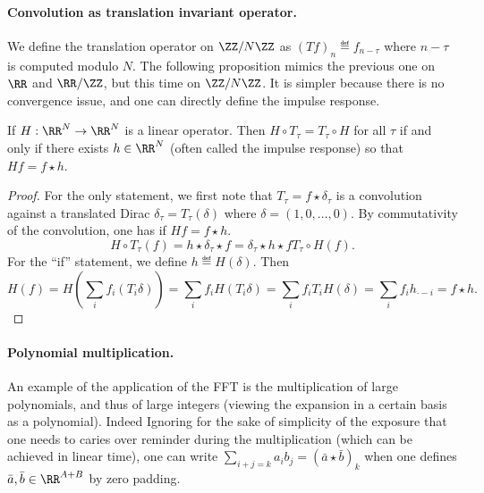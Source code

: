 \paragraph{Convolution as translation invariant operator.}

We define the translation operator on $\ZZ/N\ZZ$ as $(Tf)_n \eqdef f_{n-\tau}$ where $n-\tau$ is computed modulo $N$. The following proposition mimics the previous one on $\RR$ and $\RR/\ZZ$, but this time on $\ZZ/N\ZZ$. It is simpler because there is no convergence issue, and one can directly define the impulse response.

\begin{prop}
	If $H : \RR^N \rightarrow \RR^N$ is a linear operator. Then $H \circ T_\tau = T_\tau \circ H$ for all $\tau$ if and only if there exists $h \in \RR^N$ (often called the impulse response) so that $Hf = f \star h$.
\end{prop}

\begin{proof}
	For the only statement, we first note that $T_\tau = f \star \delta_{\tau}$ is a convolution against a translated Dirac $\delta_\tau=T_\tau(\delta)$ where $\delta=(1,0,\ldots,0)$. By commutativity of the convolution, one has if $Hf = f \star h$.
	$$
		H \circ T_\tau(f) = h \star \delta_\tau \star f = \delta_\tau \star h \star f
		T_\tau \circ H(f).
	$$	
	For the ``if'' statement, we define $h \eqdef H(\delta)$. Then 
	$$
		H(f) = H( \sum_i f_i (T_{i} \delta) ) = \sum_i f_i H(T_i \delta) = \sum_i f_i T_i H(\delta) = \sum_i f_i h_{\cdot-i} = f \star h.
	$$
	 
\end{proof}


\paragraph{Polynomial multiplication.}


An example of the application of the FFT is the multiplication of large polynomials, and thus of large integers (viewing the expansion in a certain basis as a polynomial). Indeed
Ignoring for the sake of simplicity of the exposure that one needs to caries over reminder during the multiplication (which can be achieved in linear time), 
one can write $\sum_{i+j=k} a_i b_j = (\bar a \star \bar b)_k$ when one defines $\bar a,\bar b \in \RR^{A+B}$ by zero padding. 


